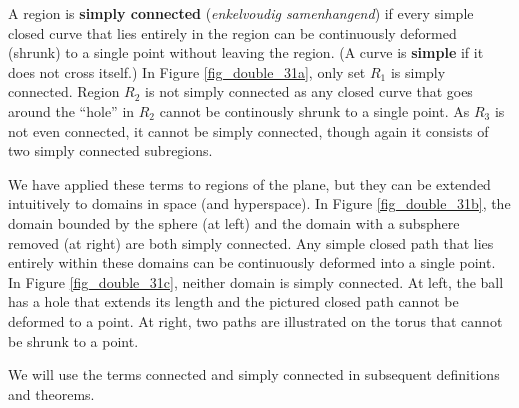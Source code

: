 A region is \textbf{simply connected} (\textit{enkelvoudig samenhangend}) if every simple closed curve that lies entirely in the region can be continuously deformed (shrunk) to a single point without leaving the region.  (A curve is \textbf{simple} if it does not cross itself.) In Figure \ref{fig_double_31a}, only set $R_1$ is simply connected. Region $R_2$ is not simply connected as any closed curve that goes around the ``hole'' in $R_2$ cannot be continously shrunk to a single point. As $R_3$ is not even connected, it cannot be simply connected, though again it consists of two simply connected subregions. 

We have applied these terms to regions of the plane, but they can be extended intuitively to domains in space (and hyperspace). In Figure \ref{fig_double_31b}, the domain bounded by the sphere (at left) and the domain with a subsphere removed (at right) are both simply connected. Any simple closed path that lies entirely within these domains can be continuously deformed into a single point. In Figure \ref{fig_double_31c}, neither domain is simply connected. At left, the ball has a hole that extends its length and the pictured closed path cannot be deformed to a point. At right, two paths are illustrated on the torus that cannot be shrunk to a point. 

We will use the terms connected and simply connected in subsequent definitions and theorems.

